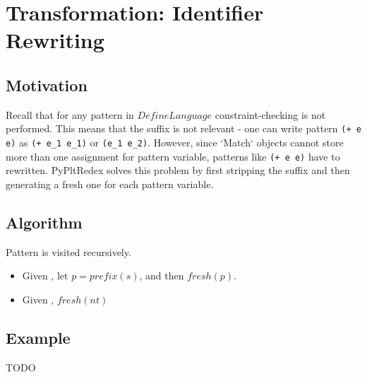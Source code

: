 \section{Transformation: Identifier Rewriting}

\subsection{Motivation}

Recall that for any pattern in $DefineLanguage$ constraint-checking is not performed. This means that the suffix is not relevant - one can write pattern \texttt{(+ e e)} as \texttt{(+ e\_1 e\_1)} or \texttt{(e\_1 e\_2)}. However, since `Match` objects cannot store more than one assignment for pattern variable, patterns like \texttt{(+ e e)} have to rewritten. PyPltRedex solves this problem by first stripping the suffix and then generating a fresh one for each pattern variable.

\subsection{Algorithm}
Pattern is visited recursively.

\begin{itemize}
\item Given \BuiltInPattern, let $p=prefix(s)$, and then $fresh(p)$.
\item Given \Nt, $fresh(nt)$
\end{itemize}

\subsection{Example}
TODO
